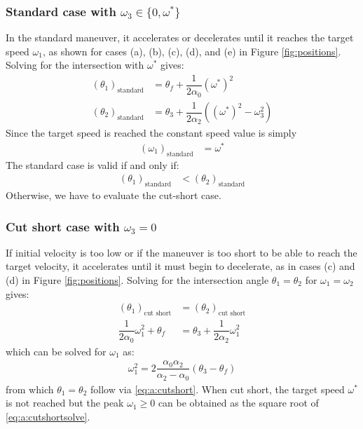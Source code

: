 \documentclass[12pt, a4paper]
{article}
\providecommand{\lr}[1]{\left(#1\right)}
\providecommand{\sub}[1]{_{\text{#1}}}
\providecommand{\w}{\omega}
\providecommand{\wt}{\w^*}
\renewcommand{\th}{\theta}
\renewcommand{\a}{\alpha}
\providecommand{\w}{\omega}
\begin{document}
\subsubsection{Standard case with $\w_3 \in \{0, \wt\}$}
\label{sec:a:standard}
In the standard maneuver, it accelerates or decelerates
until it reaches the target speed $\w_1$, as shown for cases (a), (b), (c),
(d), and (e) in Figure \ref{fig:positions}. 
Solving for the intersection with $\wt$ gives:
%
\begin{align}
    \label{eq:a:t1mt0:standard}
    \lr{\th_1}\sub{standard} &= \th_f  + \dfrac{1}{2\a_0}(\wt)^2\\[1em]
    \lr{\th_2}\sub{standard} &= \th_3  + \dfrac{1}{2\a_2}\lr{(\wt)^2 - \w_3^2}
\end{align}
%
%
Since the target speed is reached the constant speed value is simply
\begin{align}
    \lr{\w_1}\sub{standard} &= \wt
\end{align}
%
The standard case is valid if and only if:
\begin{align}
    \label{eq:a:t1mt0:standardvalidity}
    \lr{\th_1}\sub{standard} &< \lr{\th_2}\sub{standard}
\end{align}
%
Otherwise, we have to evaluate the cut-short case.
%

\subsubsection{Cut short case with $\w_3 = 0$}
\label{sec:a:cutshortw3is0}
If initial velocity is too low or if the
maneuver is too short to be able to reach the target velocity, it accelerates
until it must begin to decelerate, as in cases (c) and (d) in
Figure \ref{fig:positions}.
Solving for the intersection angle $\th_1=\th_2$ for $\w_1=\w_2$ gives:
%
\begin{align}
    \label{eq:a:cutshort}
    \lr{\th_1}\sub{cut short} &= \lr{\th_2}\sub{cut short}\\[1em]
    \dfrac{1}{2\a_0}\w_1^2 + \th_f  &= \th_3 + \dfrac{1}{2\a_2} \w_1^2 
\end{align}
%
which can be solved for $\w_1$ as:
%
\begin{align}
    \label{eq:a:cutshortsolve}
    \w_1^2 = 2 \dfrac{\a_0\a_2}{\a_2-\a_0}\lr{\th_3 - \th_f}
\end{align}
%
from which $\th_1=\th_2$ follow via \eqref{eq:a:cutshort}.
%
When cut short, the target speed $\wt$ is not reached but the
peak $\w_1 \geq 0$ can be obtained as the square root
of \eqref{eq:a:cutshortsolve}.
%
\end{document}
